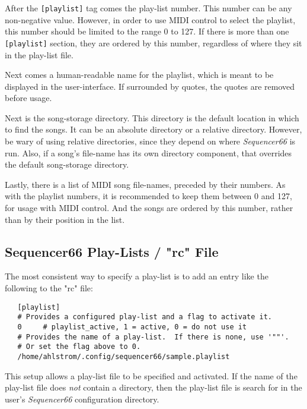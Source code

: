    After the \texttt{[playlist]} tag comes the play-list number.
   This number can be any non-negative value.
   However, in order to use MIDI control to select the playlist, this number
   should be limited to the range 0 to 127.
   If there is more than one \texttt{[playlist]} section, they are ordered by
   this number, regardless of where they sit in the play-list file.

   Next comes a human-readable name for the playlist, which is meant to be
   displayed in the user-interface.  If surrounded by quotes, the quotes are
   removed before usage.

   Next is the song-storage directory.
   This directory is the default location in which to find the songs.
   It can be an absolute directory or a relative directory.
   However, be wary of using relative directories, since they depend on where
   \textsl{Sequencer66} is run.
   Also, if a song's file-name  has its own directory component, that overrides
   the default song-storage directory.

   Lastly, there is a list of MIDI song file-names, preceded by their numbers.
   As with the playlist numbers, it is recommended to keep them between 0 and
   127, for usage with MIDI control.  And the songs are ordered by this number,
   rather than by their position in the list.

\subsection{Sequencer66 Play-Lists / "rc" File}
\label{subsec:playlist_rc_file}

   The most consistent way to specify a play-list is to add an entry like the
   following to the "rc" file:

   \begin{verbatim}
   [playlist]
   # Provides a configured play-list and a flag to activate it.
   0     # playlist_active, 1 = active, 0 = do not use it
   # Provides the name of a play-list.  If there is none, use '""'.
   # Or set the flag above to 0.
   /home/ahlstrom/.config/sequencer66/sample.playlist
   \end{verbatim}

   This setup allows a play-list file to be specified and activated.
   If the name of the play-list file does \textsl{not} contain a directory,
   then the play-list file is search for in the user's \textsl{Sequencer66}
   configuration directory.

